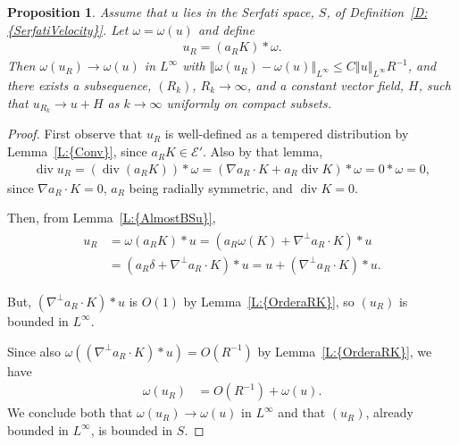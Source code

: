 \documentclass[reqno,openright,11pt,twoside]{amsart}
\newtheorem{prop}[theorem]{Proposition}
\theoremstyle{definition}
\numberwithin{equation}{section}
\begin{document}
\begin{prop}\label{P:NearRenormalizedConvergence}
	Assume that $u$ lies in the Serfati space, $S$, of {Definition~\ref{D:{SerfatiVelocity}}}.
	Let $\omega = \omega(u)$ and define
	\begin{align*}
		u_R = (a_R K) * \omega.
	\end{align*}
	Then $\omega(u_R) \to \omega(u)$ in $L^{\ensuremath{\infty}}$ with
	${\ensuremath{\left\Vert {\omega(u_R) - \omega(u)} \right\Vert}}_{L^{\ensuremath{\infty}}} \le C {\ensuremath{\left\Vert {u} \right\Vert}}_{L^{\ensuremath{\infty}}} R^{-1}$,
	and there exists a subsequence, $(R_k)$, $R_k \to {\ensuremath{\infty}}$,
	and a constant vector field, $H$,
	such that $u_{R_k} \to u + H$ as $k \to {\ensuremath{\infty}}$ uniformly on compact subsets. 
\end{prop}
\begin{proof}
	First observe that $u_R$ is well-defined as a tempered distribution by {Lemma~\ref{L:{Conv}}},
	since $a_R K \in {\ensuremath{\mathcal{{E}}}}'$.
	Also by that lemma,
	\begin{align*}
		\operatorname{div} u_R
			= (\operatorname{div} (a_R K)) * \omega
			= ({\ensuremath{\nabla}} a_R \cdot K + a_R \operatorname{div} K) * \omega
			= 0 * \omega
			= 0,
	\end{align*}
	since ${\ensuremath{\nabla}} a_R \cdot K = 0$, $a_R$ being radially symmetric,
	and $\operatorname{div} K = 0$.
		
	Then, from {Lemma~\ref{L:{AlmostBSu}}},
	\begin{align}\label{e:uRCalc}
		\begin{split}
			u_R
				&= \omega(a_R K) * u 
				= (a_R \omega(K) + {\ensuremath{\nabla}}^\perp a_R \cdot K) * u \\
					
				&= (a_R \delta + {\ensuremath{\nabla}}^\perp a_R \cdot K) * u
				    
				
				= u + ({\ensuremath{\nabla}}^\perp a_R \cdot K) * u.
		\end{split}
	\end{align}
	
	But, $({\ensuremath{\nabla}}^\perp a_R \cdot K) * u$ is $O(1)$
	by {Lemma~\ref{L:{OrderaRK}}}, so
	$(u_R)$ is bounded in $L^{\ensuremath{\infty}}$.	
	
	Since also $\omega(({\ensuremath{\nabla}}^\perp a_R \cdot K) * u) = O(R^{-1})$ by {Lemma~\ref{L:{OrderaRK}}}, we have
	\begin{align*}
		\omega(u_R)
			&= O(R^{-1}) + \omega(u).
	\end{align*}
	We conclude both that $\omega(u_R) \to \omega(u)$ in $L^{\ensuremath{\infty}}$ and that $(u_R)$,
	already bounded
	in $L^{\ensuremath{\infty}}$, is bounded in $S$.
	

\end{proof}
\end{document}
